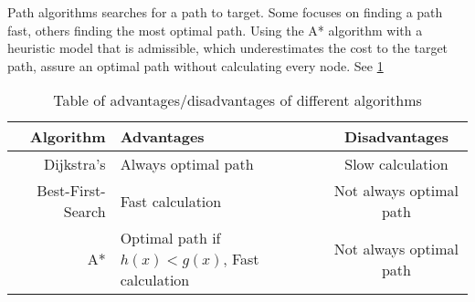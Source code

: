   Path algorithms searches for a path to target. Some focuses on finding a path fast, others finding the most optimal path. Using the A* algorithm with a heuristic model that is admissible, which underestimates the cost to the target path, assure an optimal path without calculating every node. See \cref{tbl:scheme}
  
  \begin{table}[ht!]
    \centering
    \begin{tabular}{|r|l|c|}
      \hline
      \textbf{Algorithm} & \textbf{Advantages} & \textbf{Disadvantages} \\
      \hline
      Dijkstra's & Always optimal path & Slow calculation \\
      Best-First-Search & Fast calculation & Not always optimal path \\
      A* & Optimal path if $h(x)<g(x)$, Fast calculation & Not always optimal path \\
      \hline
    \end{tabular}
    \caption{Table of advantages/disadvantages of different algorithms}
    \label{tbl:scheme}
  \end{table}